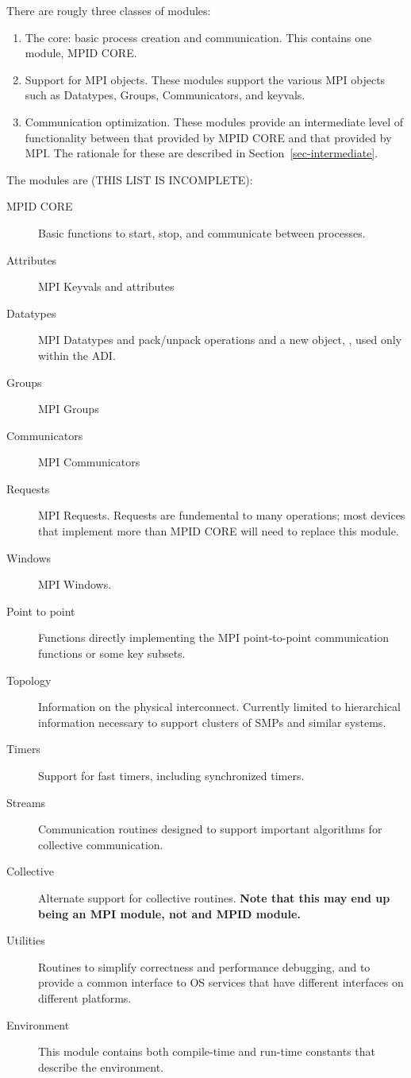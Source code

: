 \documentclass{article}
\begin{document}
There are rougly three classes of modules:
\begin{enumerate}
\item The core: basic process creation and communication. This
contains one module, MPID CORE. 
\item Support for MPI objects.  These modules support the various MPI
objects such as Datatypes, Groups, Communicators, and keyvals.
\item Communication optimization.  These modules provide an
intermediate level of functionality between that provided by MPID CORE
and that provided by MPI.  The rationale for these are described in
Section~\ref{sec-intermediate}. 
\end{enumerate}

The modules are (THIS LIST IS INCOMPLETE):
\begin{description}
\item[MPID CORE]Basic functions to start, stop, and communicate
between processes.
\item[Attributes]MPI Keyvals and attributes
\item[Datatypes]MPI Datatypes and pack/unpack operations and a new
object, , used only within the ADI.
\item[Groups]MPI Groups
\item[Communicators]MPI Communicators
\item[Requests]MPI Requests.  Requests are fundemental to many
operations; most devices that implement more than MPID CORE will need
to replace this module.
\item[Windows]MPI Windows.
\item[Point to point]Functions directly implementing the MPI
point-to-point communication functions or some key subsets.
\item[Topology]Information on the physical interconnect.  Currently
limited to hierarchical information necessary to support clusters of
SMPs and similar systems.
\item[Timers]Support for fast timers, including synchronized timers.
\item[Streams]Communication routines designed to support
important algorithms for collective communication.
\item[Collective]Alternate support for collective
routines. \textbf{Note that this may end up being an MPI module, not
and MPID module.}
\item[Utilities]Routines to simplify correctness and performance
debugging, and to provide a common interface to OS services that have
different interfaces on different platforms.
\item[Environment]This module contains both compile-time and run-time
constants that describe the environment. 
\end{description}
\end{document}
